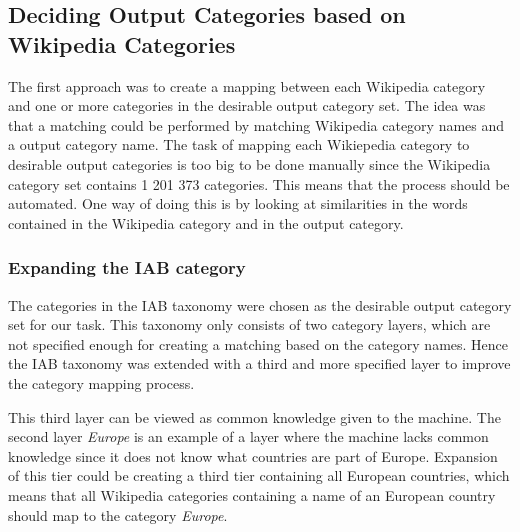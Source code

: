 \subsection{Deciding Output Categories based on Wikipedia Categories}
The first approach was to create a mapping between each Wikipedia category and one or more categories in the desirable output category set. The idea was that a matching could be performed by matching Wikipedia category names and a output category name. The task of mapping each Wikiepedia category to desirable output categories is too big to be done manually since the Wikipedia category set contains 1 201 373 categories. This means that the process should be automated. One way of doing this is by looking at similarities in the words contained in the Wikipedia category and in the output category.

\subsubsection{Expanding the IAB category}
The categories in the IAB taxonomy were chosen as the desirable output category set for our task. This taxonomy  only consists of two category layers, which are not specified enough for creating a matching based on the category names. Hence the IAB taxonomy was extended with a third and more specified layer to improve the category mapping process. 



This third layer can be viewed as common knowledge given to the machine. The second layer \emph{Europe} is an example of a layer where the machine lacks common knowledge since it does not know what countries are part of Europe. Expansion of this tier could be creating a third tier containing all European countries, which means that all Wikipedia categories containing a name of an European country should map to the category \emph{Europe}.


